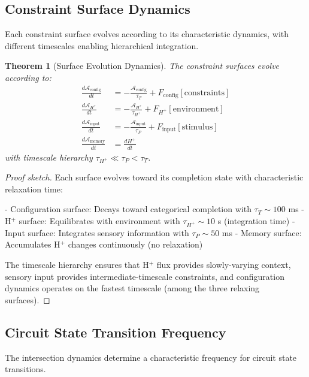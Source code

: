 \documentclass[aps,prd,twocolumn,superscriptaddress,floatfix,nofootinbib]{revtex4-2}
\newtheorem{theorem}{Theorem}[section]
\theoremstyle{remark}
\begin{document}
\subsection{Constraint Surface Dynamics}

Each constraint surface evolves according to its characteristic dynamics, with different timescales enabling hierarchical integration.

\begin{theorem}[Surface Evolution Dynamics]
\label{thm:surface_dynamics}
The constraint surfaces evolve according to:
\begin{align}
\frac{d\mathcal{A}_{\text{config}}}{dt} &= -\frac{\mathcal{A}_{\text{config}}}{\tau_T} + F_{\text{config}}[\text{constraints}] \\
\frac{d\mathcal{A}_{H^+}}{dt} &= -\frac{\mathcal{A}_{H^+}}{\tau_{H^+}} + F_{H^+}[\text{environment}] \\
\frac{d\mathcal{A}_{\text{input}}}{dt} &= -\frac{\mathcal{A}_{\text{input}}}{\tau_P} + F_{\text{input}}[\text{stimulus}] \\
\frac{d\mathcal{A}_{\text{memory}}}{dt} &= \frac{dH^+}{dt}
\end{align}
with timescale hierarchy $\tau_{H^+} \ll \tau_P < \tau_T$.
\end{theorem}

\begin{proof}[Proof sketch]
Each surface evolves toward its completion state with characteristic relaxation time:

- Configuration surface: Decays toward categorical completion with $\tau_T \sim 100$ ms
- H$^+$ surface: Equilibrates with environment with $\tau_{H^+} \sim 10$ s (integration time)
- Input surface: Integrates sensory information with $\tau_P \sim 50$ ms
- Memory surface: Accumulates H$^+$ changes continuously (no relaxation)

The timescale hierarchy ensures that H$^+$ flux provides slowly-varying context, sensory input provides intermediate-timescale constraints, and configuration dynamics operates on the fastest timescale (among the three relaxing surfaces).
\end{proof}

\subsection{Circuit State Transition Frequency}

The intersection dynamics determine a characteristic frequency for circuit state transitions.
\end{document}
